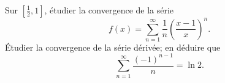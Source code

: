 

\begin{exercice}\label{exo_I-1-13}

Sur $[\frac{ 1 }{2},1]$, étudier la convergence de la série
\begin{equation}
	f(x)=\sum_{n=1}^{\infty}\frac{1}{ n }\left( \frac{ x-1 }{ x } \right)^n.
\end{equation}
Étudier la convergence de la série dérivée; en déduire que
\begin{equation}
	\sum_{n=1}^{\infty}\frac{ (-1)^{n-1} }{ n }=\ln 2.
\end{equation}
\end{exercice}
